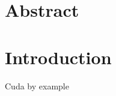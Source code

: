 
\section{Abstract}

\section{Introduction}

Cuda by example\cite{cudabyexample}

\newpage
\tableofcontents
\newpage


\newpage


\newpage


\newpage


\newpage


\newpage


\newpage



\newpage




